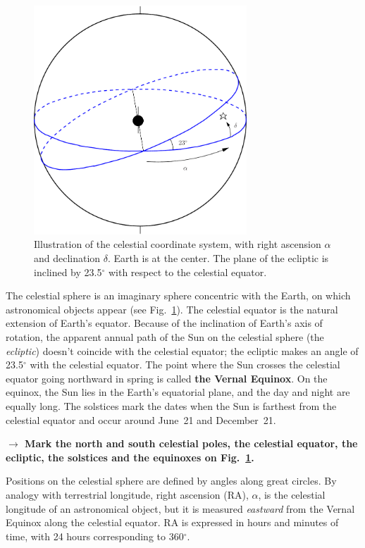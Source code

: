 \begin{figure}[ht]
\begin{center}
\includegraphics[width=8cm]{../figures/celestial.pdf}
\end{center}
\caption{Illustration of the celestial coordinate system, with right ascension $\alpha$ 
and declination $\delta$. 
Earth is at the center. The plane of the ecliptic is inclined by 23.5$^\circ$ with 
respect to the celestial equator. }
\label{figcelest}
\end{figure}

The celestial sphere is an imaginary sphere concentric with the Earth, on which
astronomical objects appear (see Fig.~\ref{figcelest}). 
The celestial equator is the
natural extension of Earth's equator. Because of the inclination of 
Earth's axis of rotation, the apparent annual path of the Sun
on the celestial sphere (the {\em ecliptic}) doesn't  coincide with the 
celestial equator; the ecliptic makes an angle of 23.5$^\circ$
with the celestial equator. The point where the Sun crosses the
celestial
equator going northward in spring is called {\bf the Vernal 
Equinox}. 
On the equinox, the Sun lies
in the Earth's equatorial plane, and the day and night are equally
long. The solstices mark the dates when the Sun is farthest from 
the celestial equator and occur around June~21 and December~21. 

\medskip
{\bf{$\rightarrow$ Mark the north and south celestial poles, 
the celestial equator, the ecliptic,
the solstices and the equinoxes on Fig.~\ref{figcelest}.}}
\medskip

Positions on the celestial sphere are defined by angles along 
great circles. By analogy with terrestrial longitude, 
right ascension (RA), $\alpha$, is the celestial longitude of an
astronomical object, 
but it is measured {\em eastward} from the Vernal Equinox
along the celestial equator. RA is expressed
in hours and minutes of time, with 24 hours corresponding 
to 360$^\circ$. 

